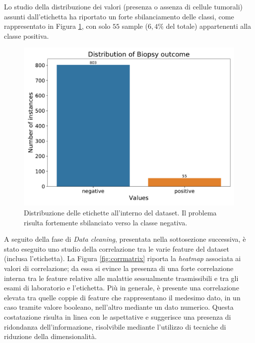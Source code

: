 Lo studio della distribuzione dei valori (presenza o assenza di cellule tumorali) assunti dall'etichetta ha riportato un forte sbilanciamento delle classi, come rappresentato in Figura \ref{fig:biopsydistribution}, con solo $55$ sample ($6,4\%$ del totale) appartenenti alla classe positiva.
\begin{figure}
	\centering
	\includegraphics[width=1\linewidth]{images/biopsy_distribution}
	\caption{Distribuzione delle etichette all'interno del dataset. Il problema risulta fortemente sbilanciato verso la classe negativa.}
	\label{fig:biopsydistribution}
\end{figure}
A seguito della fase di \textit{Data cleaning}, presentata nella sottosezione successiva, è stato eseguito uno studio della correlazione tra le varie feature del dataset (inclusa l'etichetta). La Figura \ref{fig:corrmatrix} riporta la \textit{heatmap} associata ai valori di correlazione; da essa si evince la presenza di una forte correlazione interna tra le feature relative alle malattie sessualmente trasmissibili e tra gli esami di laboratorio e l'etichetta. Più in generale, è presente una correlazione elevata tra quelle coppie di feature che rappresentano il medesimo dato, in un caso tramite valore booleano, nell'altro mediante un dato numerico. Questa costatazione risulta in linea con le aspettative e suggerisce una presenza di ridondanza dell'informazione, risolvibile mediante l'utilizzo di tecniche di riduzione della dimensionalità.

